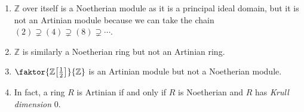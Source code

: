 \begin{example}
    \begin{enumerate}
        \item \( \mathbb Z \) over itself is a Noetherian module as it is a principal ideal domain, but it is not an Artinian module because we can take the chain \( (2) \supsetneq (4) \supsetneq (8) \supsetneq \cdots \).
        \item \( \mathbb Z \) is similarly a Noetherian ring but not an Artinian ring.
        \item \( \faktor{\mathbb Z\qty[\frac{1}{2}]}{\mathbb Z} \) is an Artinian module but not a Noetherian module.
        \item In fact, a ring \( R \) is Artinian if and only if \( R \) is Noetherian and \( R \) has \emph{Krull dimension} 0.
    \end{enumerate}
\end{example}

